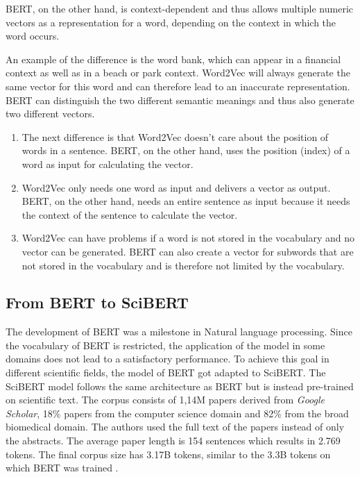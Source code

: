 BERT, on the other hand, is context-dependent and thus allows multiple numeric vectors as a representation for a word, depending on the context in which the word occurs.

An example of the difference is the word bank, which can appear in a financial context as well as in a beach or park context. Word2Vec will always generate the same vector for this word and can therefore lead to an inaccurate representation. BERT can distinguish the two different semantic meanings and thus also generate two different vectors.

\begin{enumerate}
	\item The next difference is that Word2Vec doesn't care about the position of words in a sentence. BERT, on the other hand, uses the position (index) of a word as input for calculating the vector.
	\item Word2Vec only needs one word as input and delivers a vector as output. BERT, on the other hand, needs an entire sentence as input because it needs the context of the sentence to calculate the vector.
	\item Word2Vec can have problems if a word is not stored in the vocabulary and no vector can be generated. BERT can also create a vector for subwords that are not stored in the vocabulary and is therefore not limited by the vocabulary.
\end{enumerate}

\subsection{From BERT to SciBERT}
The development of BERT was a milestone in Natural language processing. Since the vocabulary of BERT is restricted, the application of the model in some domains does not lead to a satisfactory performance. To achieve this goal in different scientific fields, the model of BERT got adapted to SciBERT. The SciBERT model follows the same architecture as BERT but is instead pre-trained on scientific text. The corpus consists of 1,14M papers derived from \textit{Google Scholar}, 18\% papers from the computer science domain and 82\% from the broad biomedical domain. The authors used the full text of the papers instead of only the abstracts. The average paper length is 154 sentences which results in 2.769 tokens. The final corpus size has 3.17B tokens, similar to the 3.3B tokens on which BERT was trained \cite{Beltagy}. \newline

